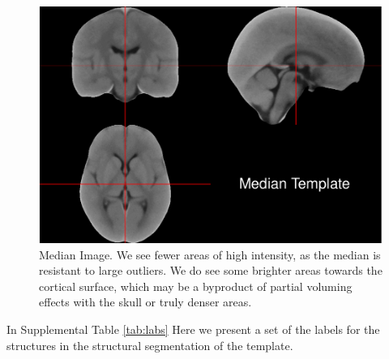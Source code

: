 \documentclass[]{elsarticle} %
\makeatletter
\def\maxwidth{\ifdim\Gin@nat@width>\linewidth\linewidth
\else\Gin@nat@width\fi}
\let\Oldincludegraphics\includegraphics
\renewcommand{\includegraphics}[1]{\Oldincludegraphics[width=\maxwidth]{#1}}
\makeatother
\begin{document}
\begin{figure}
\centering
\includegraphics{index_with_supp_files/figure-latex/median-1.pdf}
\caption{\label{fig:median}Median Image. We see fewer areas of high intensity, as the median is resistant to large outliers. We do see some brighter areas towards the cortical surface, which may be a byproduct of partial voluming effects with the skull or truly denser areas.}
\end{figure}

In Supplemental Table \ref{tab:labs} Here we present a set of the labels for the structures in the structural segmentation of the template.
\end{document}
